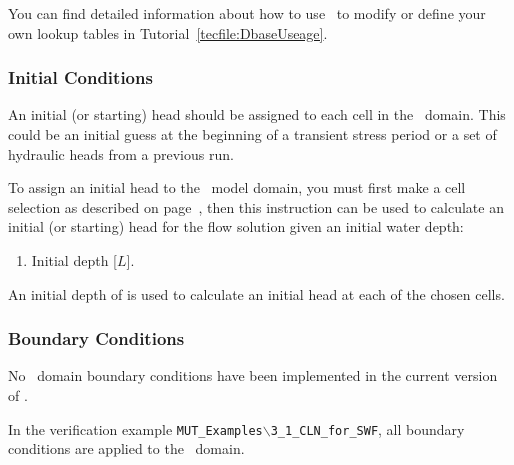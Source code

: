 You can find detailed information about how to use \dbase\ to modify or define your own lookup tables in Tutorial~\ref{tecfile:DbaseUseage}.

\subsubsection{Initial Conditions}  
An initial (or starting) head should be assigned to each cell in the \cln\ domain.  This could be an initial guess at the beginning of a transient stress period or a set of hydraulic heads from a previous run.

To assign an initial head to the \cln\ model domain, you must first make a cell selection as described on page~\pageref{page:cellSelect}, then this instruction can be used to calculate an initial (or starting) head for the flow solution given an initial water depth:

    {
        \squish
        \begin{enumerate}
        \item {}  Initial depth [$L$].
        \end{enumerate}
          An initial depth of  is used to calculate an initial head at each of the chosen cells.
    }

\subsubsection{Boundary Conditions}  
No \cln\ domain boundary conditions have been implemented in the current version of \mut.

In the verification example \texttt{MUT\_Examples$\backslash$3\_1\_CLN\_for\_SWF}, all boundary conditions are applied to the \gwf\ domain.


